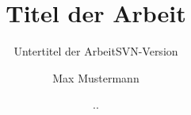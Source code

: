 \documentclass[ngerman,12pt,oneside]{scrbook}
\author{Max Mustermann}
\title{Titel der Arbeit}
\subtitle{Untertitel der Arbeit}
\date{\svnfileday.\svnfilemonth.\svnfileyear}
\subtitle{SVN-Version \svnrev}
\begin{document}
\maketitle

\frontmatter
\tableofcontents
\listoffigures
\listoftables
\listoftodos
\lstlistoflistings 

\mainmatter



\backmatter
\nocite{*}


\printbibliography 
\printnomenclature
\printindex
\printglossaries
\end{document}
